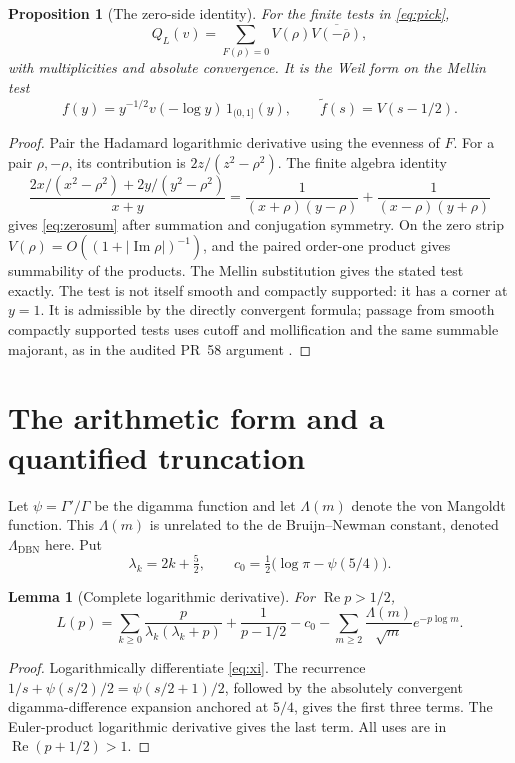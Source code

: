 \documentclass[11pt,letterpaper]{article}
\newtheorem{proposition}[theorem]{Proposition}
\newtheorem{lemma}[theorem]{Lemma}
\theoremstyle{definition}
\theoremstyle{remark}
\newcommand{\Rea}{\operatorname{Re}}
\newcommand{\Ima}{\operatorname{Im}}
\newcommand{\abs}[1]{\left\lvert#1\right\rvert}
\numberwithin{equation}{section}
\begin{document}
\begin{proposition}[The zero-side identity]\label{prop:weil}
For the finite tests in \eqref{eq:pick},
\begin{equation}\label{eq:zerosum}
 Q_L(v)=\sum_{F(\rho)=0} V(\rho)\overline{V(-\overline\rho)},
\end{equation}
with multiplicities and absolute convergence. It is the Weil form on the Mellin test
\[
 f(y)=y^{-1/2}v(-\log y)\,1_{(0,1]}(y),\qquad
 \widetilde f(s)=V(s-1/2).
\]
\end{proposition}
\begin{proof}
Pair the Hadamard logarithmic derivative using the evenness of $F$. For a pair $\rho,-\rho$, its contribution is $2z/(z^2-\rho^2)$. The finite algebra identity
\[
 \frac{2x/(x^2-\rho^2)+2y/(y^2-\rho^2)}{x+y}
 =\frac1{(x+\rho)(y-\rho)}+\frac1{(x-\rho)(y+\rho)}
\]
gives \eqref{eq:zerosum} after summation and conjugation symmetry. On the zero strip $V(\rho)=O((1+\abs{\Ima\rho})^{-1})$, and the paired order-one product gives summability of the products. The Mellin substitution gives the stated test exactly. The test is not itself smooth and compactly supported: it has a corner at $y=1$. It is admissible by the directly convergent formula; passage from smooth compactly supported tests uses cutoff and mollification and the same summable majorant, as in the audited PR~58 argument \cite{pr58}.
\end{proof}

\section{The arithmetic form and a quantified truncation}

Let $\psi=\Gamma'/\Gamma$ be the digamma function and let $\Lambda(m)$ denote the von Mangoldt function. This $\Lambda(m)$ is unrelated to the de Bruijn--Newman constant, denoted $\Lambda_{\mathrm{DBN}}$ here. Put
\[
 \lambda_k=2k+\tfrac52,\qquad c_0=\tfrac12\bigl(\log\pi-\psi(5/4)\bigr).
\]
\begin{lemma}[Complete logarithmic derivative]
For $\Rea p>1/2$,
\begin{equation}\label{eq:Lseries}
 L(p)=\sum_{k\ge0}\frac{p}{\lambda_k(\lambda_k+p)}
       +\frac1{p-1/2}-c_0
       -\sum_{m\ge2}\frac{\Lambda(m)}{\sqrt m}e^{-p\log m}.
\end{equation}
\end{lemma}
\begin{proof}
Logarithmically differentiate \eqref{eq:xi}. The recurrence
$1/s+\psi(s/2)/2=\psi(s/2+1)/2$, followed by the absolutely convergent digamma-difference expansion anchored at $5/4$, gives the first three terms. The Euler-product logarithmic derivative gives the last term. All uses are in $\Rea(p+1/2)>1$.
\end{proof}
\end{document}
